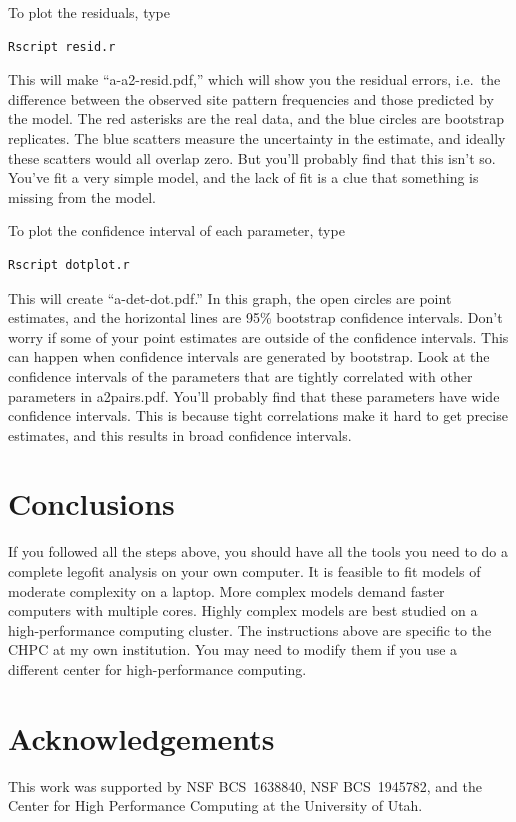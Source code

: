 \documentclass[11pt]{article}
\begin{document}
To plot the residuals, type
\begin{verbatim}
Rscript resid.r
\end{verbatim}
This will make ``a-a2-resid.pdf,'' which will show you the residual
errors, i.e.\ the difference between the observed site pattern
frequencies and those predicted by the model. The red asterisks are
the real data, and the blue circles are bootstrap replicates. The blue
scatters measure the uncertainty in the estimate, and ideally these
scatters would all overlap zero. But you'll probably find that this
isn't so. You've fit a very simple model, and the lack of fit is a
clue that something is missing from the model.

To plot the confidence interval of each parameter, type
\begin{verbatim}
Rscript dotplot.r
\end{verbatim}
This will create ``a-det-dot.pdf.'' In this graph, the open circles
are point estimates, and the horizontal lines are 95\% bootstrap
confidence intervals. Don't worry if some of your point estimates are
outside of the confidence intervals. This can happen when confidence
intervals are generated by bootstrap. Look at the confidence intervals
of the parameters that are tightly correlated with other parameters in
a2pairs.pdf. You'll probably find that these parameters have wide
confidence intervals. This is because tight correlations make it hard
to get precise estimates, and this results in broad confidence
intervals. 

\section{Conclusions}
\label{sec.conclusions}
If you followed all the steps above, you should have all the tools you
need to do a complete legofit analysis on your own computer. It is
feasible to fit models of moderate complexity on a laptop. More
complex models demand faster computers with multiple cores. Highly
complex models are best studied on a high-performance computing
cluster. The instructions above are specific to the CHPC at my own
institution. You may need to modify them if you use a different center
for high-performance computing.

\section*{Acknowledgements}
This work was supported by NSF BCS~1638840, NSF BCS~1945782, and the Center
for High Performance Computing at the University of Utah.

\printbibliography
\end{document}
